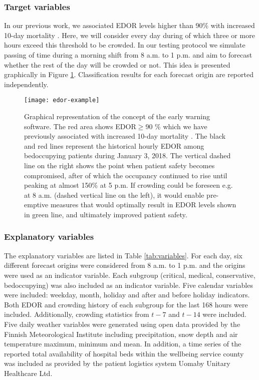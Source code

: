 \subsubsection{Target variables}

In our previous work, we associated EDOR levels higher than 90\% with increased 10-day mortality \cite{Eidsto2023}. Here, we will consider every day during of which three or more hours exceed this threshold to be crowded. In our testing protocol we simulate passing of time during a morning shift from 8 a.m. to 1 p.m. and aim to forecast whether the rest of the day will be crowded or not. This idea is presented graphically in Figure \ref{fig:concept}. Classification results for each forecast origin are reported independently.

\begin{figure}[H]
    \centering
        \texttt{[image: edor-example]}
        \caption{Graphical representation of the concept of the early warning software. The red area shows EDOR$\ge$90 \% which we have previously associated with increased 10-day mortality \cite{Eidsto2023}. The black and red lines represent the historical hourly EDOR among bedoccupying patients during January 3, 2018. The vertical dashed line on the right shows the point when patient safety becomes compromised, after of which the occupancy continued to rise until peaking at almost 150\% at 5 p.m. If crowding could be foreseen e.g. at 8 a.m. (dashed vertical line on the left), it would enable pre-emptive measures that would optimally result in EDOR levels shown in green line, and ultimately improved patient safety.}
        \label{fig:concept}
\end{figure}

\subsubsection{Explanatory variables}

The explanatory variables are listed in Table \ref{tab:variables}. For each day, six different forecast origins were considered from 8 a.m. to 1 p.m. and the origins were used as an indicator variable. Each subgroup (critical, medical, conservative, bedoccupying) was also included as an indicator variable. Five calendar variables were included: weekday, month, holiday and after and before holiday indicators. Both EDOR and crowding history of each subgroup for the last 168 hours were included. Additionally, crowding statistics from $t-7$ and $t-14$ were included. Five daily weather variables were generated using open data provided by the Finnish Meteorological Institute \cite{FMI} including precipitation, snow depth and air temperature maximum, minimum and mean. In addition, a time series of the reported total availability of hospital beds within the wellbeing service county was included as provided by the patient logistics system Uoma\textregistered  by Unitary Healthcare Ltd.


